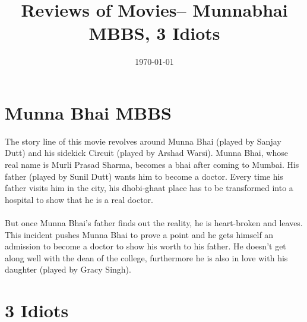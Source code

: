 \documentclass{article}
\title{Reviews of Movies-- Munnabhai MBBS, 3 Idiots}
\date{\today}
\begin{document}
\maketitle

\section{Munna Bhai MBBS}
The story line of this movie revolves around Munna Bhai (played by Sanjay Dutt) and his sidekick Circuit (played by Arshad Warsi). Munna Bhai, whose real name is Murli Prasad Sharma, becomes a bhai after coming to Mumbai. His father (played by Sunil Dutt) wants him to become a doctor. Every time his father visits him in the city, his dhobi-ghaat place has to be transformed into a hospital to show that he is a real doctor. \\ \\

But once Munna Bhai's father finds out the reality, he is heart-broken and leaves. This incident pushes Munna Bhai to prove a point and he gets himself an admission to become a doctor to show his worth to his father. He doesn't get along well with the dean of the college, furthermore he is also in love with his daughter (played by Gracy Singh). 



\section{3 Idiots}
\end{document}
